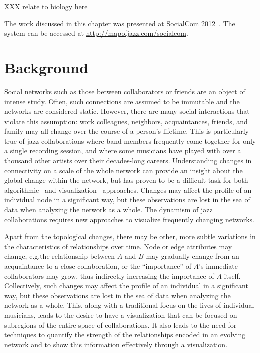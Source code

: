 \documentclass[12pt]{cmuthesis}
\begin{document}
XXX relate to biology here

The work discussed in this chapter was presented at SocialCom 2012~\cite{Filippova2012moj}. The system can be accessed at \url{http://mapofjazz.com/socialcom}.

\section{Background}

  Social networks such as those between collaborators or friends are an object of intense study. Often, such connections are assumed to be immutable and the networks are considered static. However, there are many social interactions that violate this assumption: work colleagues, neighbors, acquaintances, friends, and family may all change over the course of a person's lifetime. This is particularly true of jazz collaborations where band members frequently come together for only a single recording session, and where some musicians have played with over a thousand other artists over their decades-long careers. Understanding changes in connectivity on a scale of the whole network can provide an insight about the global change within the network, but has proven to be a difficult task for both algorithmic~\cite{Hopcroft2004, Palla2005c, Tantipathananandh2007, TangLiuZhna08} and visualization~\cite{BenderDeMoll2006, Rosvall2010,Yi2010} approaches. Changes may affect the profile of an individual node in a significant way, but these observations are lost in the sea of data when analyzing the network as a whole. The dynamism of jazz collaborations requires new approaches to visualize frequently changing networks.

  Apart from the topological changes, there may be other, more subtle variations in the characteristics of relationships over time.  Node or edge attributes may change, e.g.\@ the relationship between $A$ and $B$ may gradually change from an acquaintance to a close collaboration, or the ``importance'' of $A$'s immediate collaborators may grow, thus indirectly increasing the importance of $A$ itself.  Collectively, such changes may affect the profile of an individual in a significant way, but these observations are lost in the sea of data when analyzing the network as a whole. This, along with a traditional focus on the lives of individual musicians, leads to the desire to have a visualization that can be focused on subregions of the entire space of collaborations. It also leads to the need for techniques to quantify the strength of the relationships encoded in an evolving network and to show this information effectively through a visualization.
\end{document}
